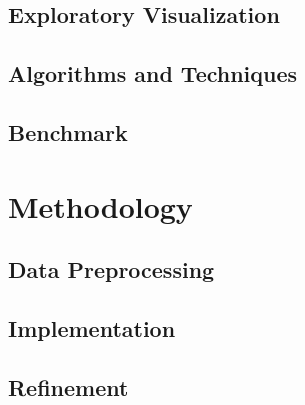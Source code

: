 \documentclass[paper=A4, parskip=half]{scrartcl}
\begin{document}
\subsection*{Exploratory Visualization}


\subsection*{Algorithms and Techniques}


\subsection*{Benchmark}


\section*{Methodology}

\subsection*{Data Preprocessing}


\subsection*{Implementation}


\subsection*{Refinement}
\end{document}
